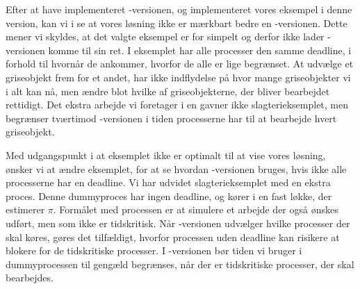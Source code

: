 


Efter at have implementeret -versionen, og implementeret vores eksempel i denne version, kan vi i  se at vores løsning ikke er mærkbart bedre en -versionen. Dette mener vi skyldes, at det valgte eksempel er for simpelt og derfor ikke lader -versionen komme til sin ret. I eksemplet har alle processer den samme deadline, i forhold til hvornår de ankommer, hvorfor de alle er lige begrænset. At udvælge et griseobjekt frem for et andet, har ikke indflydelse på  hvor mange griseobjekter vi i alt kan nå, men ændre blot hvilke af griseobjekterne, der bliver bearbejdet rettidigt. Det ekstra arbejde vi foretager i \sched en gavner ikke slagterieksemplet, men  begrænser tværtimod -versionen i tiden processerne har til at bearbejde hvert griseobjekt.

Med udgangspunkt i at eksemplet ikke er optimalt til at vise vores løsning, ønsker vi at ændre eksemplet, for at se hvordan -versionen bruges, hvis ikke alle processerne har en deadline. Vi har udvidet slagterieksemplet med en ekstra proces. Denne dummyproces har ingen deadline, og kører i en fast løkke, der estimerer $\pi$. Formålet med processen er at simulere et arbejde der også ønskes udført, men som ikke er tidskritisk. Når -versionen udvælger hvilke processer der skal køres, gøres det tilfældigt, hvorfor processen uden deadline kan risikere at blokere for de tidskritiske processer. I -versionen bør tiden vi bruger i  dummyprocessen til gengæld begrænses, når der er tidskritiske processer, der skal bearbejdes.

